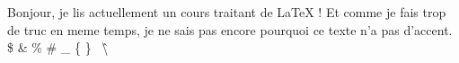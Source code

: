 \documentclass{article}
\begin{document}
Bonjour, je lis actuellement un cours traitant de LaTeX !
Et comme je fais trop de truc en meme temps, je ne sais pas encore pourquoi ce texte n'a pas d'accent.
\$ \& \% \# \_ \{ \} \  \^ \textbackslash{}
\end{document}
